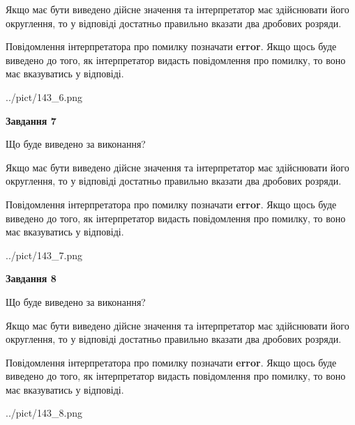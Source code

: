 \documentclass[12pt, ukrainian]{article}
\begin{document}
{\begin {Large}
Якщо має бути виведено дійсне значення та інтерпретатор має здійснювати його округлення, 
то у відповіді достатньо правильно вказати два дробових розряди.

Повідомлення інтерпретатора про помилку позначати \textbf{error}.
Якщо щось буде виведено до того, як інтерпретатор видасть повідомлення про помилку, 
то воно має вказуватись у відповіді. \par

\begin{center}
	{../pict/143_6.png}
\end{center}
\newpage

{\begin {center}\textbf{Завдання 7}\end {center}}\par
Що буде виведено за виконання? \par

Якщо має бути виведено дійсне значення та інтерпретатор має здійснювати його округлення, 
то у відповіді достатньо правильно вказати два дробових розряди.

Повідомлення інтерпретатора про помилку позначати \textbf{error}.
Якщо щось буде виведено до того, як інтерпретатор видасть повідомлення про помилку, 
то воно має вказуватись у відповіді. \par

\begin{center}
	{../pict/143_7.png}
\end{center}
\newpage

{\begin {center}\textbf{Завдання 8}\end {center}}\par
Що буде виведено за виконання? \par

Якщо має бути виведено дійсне значення та інтерпретатор має здійснювати його округлення, 
то у відповіді достатньо правильно вказати два дробових розряди.

Повідомлення інтерпретатора про помилку позначати \textbf{error}.
Якщо щось буде виведено до того, як інтерпретатор видасть повідомлення про помилку, 
то воно має вказуватись у відповіді. \par

\begin{center}
	{../pict/143_8.png}
\end{center}
\newpage


\end{Large}}
\end{document}
